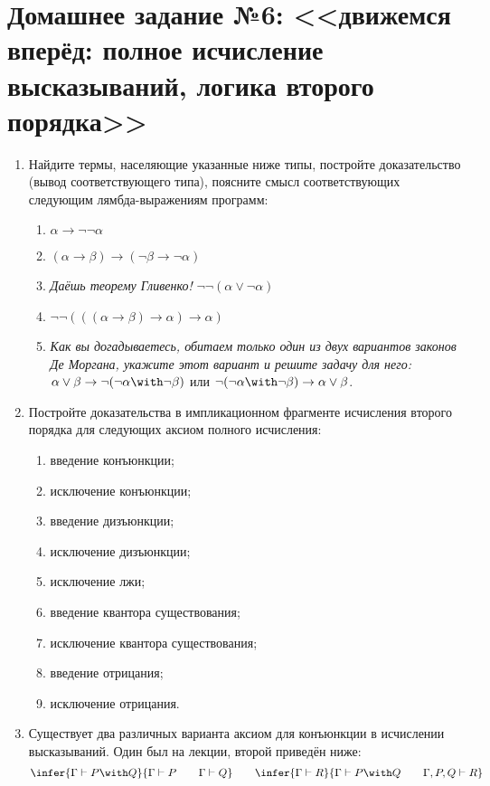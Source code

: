 \documentclass[10pt,a4paper,oneside]{article}
\begin{document}
\section*{Домашнее задание №6: <<движемся вперёд: полное исчисление высказываний, логика второго порядка>>}
\begin{enumerate}
\item Найдите термы, населяющие указанные ниже типы, постройте доказательство (вывод соответствующего типа),
      поясните смысл соответствующих следующим лямбда-выражениям программ:
\begin{enumerate}
\item $\alpha\rightarrow\neg\neg\alpha$
\item $(\alpha\rightarrow\beta)\rightarrow(\neg\beta\rightarrow\neg\alpha)$
\item \emph{Даёшь теорему Гливенко!} $\neg\neg(\alpha\vee\neg\alpha)$
\item $\neg\neg(((\alpha\rightarrow\beta)\rightarrow\alpha)\rightarrow\alpha)$
\item \emph{Как вы догадываетесь, обитаем только один из двух вариантов законов Де Моргана, укажите этот вариант
      и решите задачу для него:} 
      $\alpha\vee\beta\rightarrow\neg(\neg\alpha\with\neg\beta)$ или 
      $\neg(\neg\alpha\with\neg\beta)\rightarrow\alpha\vee\beta$.
\end{enumerate}

\item Постройте доказательства в импликационном фрагменте исчисления второго порядка для следующих аксиом
полного исчисления:
\begin{enumerate}
\item введение конъюнкции;
\item исключение конъюнкции;
\item введение дизъюнкции;
\item исключение дизъюнкции;
\item исключение лжи;
\item введение квантора существования;
\item исключение квантора существования;
\item введение отрицания;
\item исключение отрицания.
\end{enumerate}

\item Существует два различных варианта аксиом для конъюнкции в исчислении высказываний. Один был на лекции, 
второй приведён ниже:
$$
\infer{\Gamma\vdash P\with Q}{\Gamma\vdash P\quad\quad\Gamma\vdash Q}
\quad\quad\infer{\Gamma\vdash R}{\Gamma\vdash P\with Q\quad\quad\Gamma,P,Q\vdash R}
$$


\end{enumerate}
\end{document}

